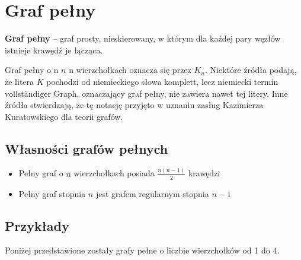 \documentclass[10pt,a4paper,onecolumn]{article}
\begin{document}
\section{Graf pełny\cite{graf}}
\textbf{Graf pełny} – graf prosty, nieskierowany, w którym dla każdej pary węzłów istnieje krawędź je łącząca.

Graf pełny o n $n$ n wierzchołkach oznacza się przez $K_n$. Niektóre źródła podają, że litera $K$ pochodzi od niemieckiego słowa komplett, lecz niemiecki termin vollständiger Graph, oznaczający graf pełny, nie zawiera nawet tej litery. Inne źródła stwierdzają, że tę notację przyjęto w uznaniu zasług Kazimierza Kuratowskiego dla teorii grafów.

\subsection{Własności grafów pełnych}
\begin{itemize}
\item Pełny graf o $n$ wierzchołkach posiada $\frac{n(n-1)}{2}$ krawędzi
\item Pełny graf stopnia $n$ jest grafem regularnym stopnia $n-1$
\end{itemize}
\subsection{Przykłady} 
Poniżej przedstawione zostały grafy pełne o liczbie wierzchołków od 1 do 4.
\vspace*{15px} 
\begin{center}


\vspace*{15px}
\end{center}

\begin{center}
\vspace*{15px}
\end{center}
\end{document}
